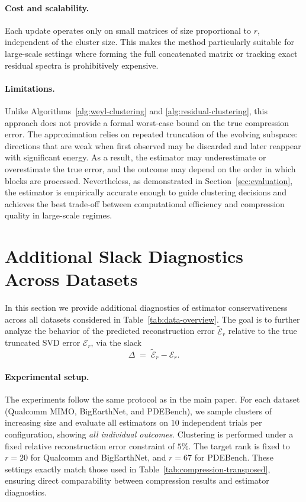 \documentclass[10pt]{article} %
\begin{document}
\paragraph{Cost and scalability.}
Each update operates only on small matrices of size proportional to $r$,
independent of the cluster size. This makes the method particularly suitable
for large-scale settings where forming the full concatenated matrix or
tracking exact residual spectra is prohibitively expensive.

\paragraph{Limitations.}
Unlike Algorithms~\ref{alg:weyl-clustering} and
\ref{alg:residual-clustering}, this approach does not provide a formal
worst-case bound on the true compression error. The approximation relies on
repeated truncation of the evolving subspace: directions that are weak when
first observed may be discarded and later reappear with significant energy.
As a result, the estimator may underestimate or overestimate the true error,
and the outcome may depend on the order in which blocks are processed.
Nevertheless, as demonstrated in Section~\ref{sec:evaluation}, the estimator is
empirically accurate enough to guide clustering decisions and achieves the
best trade-off between computational efficiency and compression quality in
large-scale regimes.


\section{Additional Slack Diagnostics Across Datasets}
\label{app:slack-diagnostics}

In this section we provide additional diagnostics of estimator conservativeness across all datasets considered in Table~\ref{tab:data-overview}.
The goal is to further analyze the behavior of the predicted reconstruction error $\widetilde{\mathcal{E}}_r$ relative to the true truncated SVD error $\mathcal{E}_r$, via the slack
\[
\Delta \;=\; \widetilde{\mathcal{E}}_r - \mathcal{E}_r.
\]

\paragraph{Experimental setup.}
The experiments follow the same protocol as in the main paper.
For each dataset (Qualcomm MIMO, BigEarthNet, and PDEBench), we sample clusters of increasing size and evaluate all estimators on $10$ independent trials per configuration, showing \emph{all individual outcomes}.
Clustering is performed under a fixed relative reconstruction error constraint of $5\%$.
The target rank is fixed to $r=20$ for Qualcomm and BigEarthNet, and $r=67$ for PDEBench.
These settings exactly match those used in Table~\ref{tab:compression-transposed}, ensuring direct comparability between compression results and estimator diagnostics.
\end{document}
